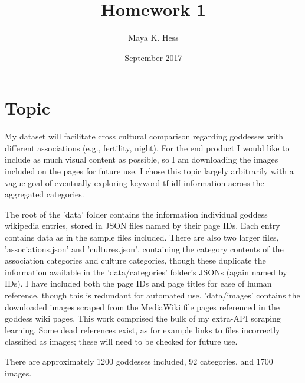 \documentclass{article}
\title{Homework 1}
\author{Maya K. Hess}
\date{September 2017}
\begin{document}
\maketitle

\section{Topic}
My dataset will facilitate cross cultural comparison regarding goddesses with different associations (e.g., fertility, night). For the end product I would like to include as much visual content as possible, so I am downloading the images included on the pages for future use.
I chose this topic largely arbitrarily with a vague goal of eventually exploring keyword tf-idf information across the aggregated categories.

The root of the 'data' folder contains the information individual goddess wikipedia entries, stored in JSON files named by their page IDs. Each entry contains data as in the sample files included. There are also two larger files, 'associations.json' and 'cultures.json', containing the category contents of the association categories and culture categories, though these duplicate the information available in the 'data/categories' folder's JSONs (again named by IDs). I have included both the page IDs and page titles for ease of human reference, though this is redundant for automated use. 'data/images' contains the downloaded images scraped from the MediaWiki file pages referenced in the goddess wiki pages. This work comprised the bulk of my extra-API scraping learning. Some dead references exist, as for example links to files incorrectly classified as images; these will need to be checked for future use.

There are approximately 1200 goddesses included, 92 categories, and 1700 images.
\end{document}
